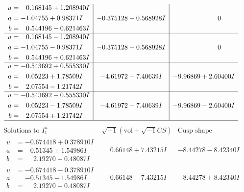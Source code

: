 \documentclass[1p]{elsarticle_modified}
\theoremstyle{definition}
\newcommand{\I}{\sqrt{-1}}
\begin{document}
$$\begin{array}{c|c|c}
\begin{aligned}
u &= \phantom{-}0.168145 + 1.208940 I \\
a &= -1.04755 + 0.98371 I \\
b &= \phantom{-}0.544196 - 0.621463 I\end{aligned}
 & -0.375128 - 0.568928 I & \phantom{-0.000000 } 0 \\ \hline\begin{aligned}
u &= \phantom{-}0.168145 - 1.208940 I \\
a &= -1.04755 - 0.98371 I \\
b &= \phantom{-}0.544196 + 0.621463 I\end{aligned}
 & -0.375128 + 0.568928 I & \phantom{-0.000000 } 0 \\ \hline\begin{aligned}
u &= -0.543692 + 0.555330 I \\
a &= \phantom{-}0.05223 + 1.78509 I \\
b &= \phantom{-}2.07554 - 1.21742 I\end{aligned}
 & -4.61972 - 7.40639 I & -9.96869 + 2.60400 I \\ \hline\begin{aligned}
u &= -0.543692 - 0.555330 I \\
a &= \phantom{-}0.05223 - 1.78509 I \\
b &= \phantom{-}2.07554 + 1.21742 I\end{aligned}
 & -4.61972 + 7.40639 I & -9.96869 - 2.60400 I\\
 \hline 
 \end{array}$$\newpage$$\begin{array}{c|c|c}  
\text{Solutions to }I^u_{1}& \I (\text{vol} + \sqrt{-1}CS) & \text{Cusp shape}\\
 \hline 
\begin{aligned}
u &= -0.674418 + 0.378910 I \\
a &= -0.51345 + 1.54986 I \\
b &= \phantom{-}2.19270 + 0.48087 I\end{aligned}
 & \phantom{-}0.66148 + 7.43215 I & -8.44278 - 8.42340 I \\ \hline\begin{aligned}
u &= -0.674418 - 0.378910 I \\
a &= -0.51345 - 1.54986 I \\
b &= \phantom{-}2.19270 - 0.48087 I\end{aligned}
 & \phantom{-}0.66148 - 7.43215 I & -8.44278 + 8.42340 I \\ \hline\begin{aligned}

\end{aligned}
\end{array}$$
\end{document}
